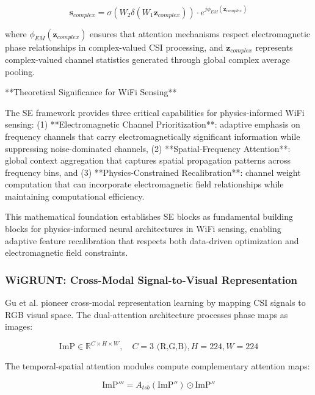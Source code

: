 \documentclass[journal]{IEEEtran}
\begin{document}
{\begin{equation}
\mathbf{s}_{complex} = \sigma(W_2\delta(W_1\mathbf{z}_{complex})) \cdot e^{j\phi_{EM}(\mathbf{z}_{complex})}
\label{eq:se_physics_complex}
\end{equation}

where $\phi_{EM}(\mathbf{z}_{complex})$ ensures that attention mechanisms respect electromagnetic phase relationships in complex-valued CSI processing, and $\mathbf{z}_{complex}$ represents complex-valued channel statistics generated through global complex average pooling.

**Theoretical Significance for WiFi Sensing**

The SE framework provides three critical capabilities for physics-informed WiFi sensing: (1) **Electromagnetic Channel Prioritization**: adaptive emphasis on frequency channels that carry electromagnetically significant information while suppressing noise-dominated channels, (2) **Spatial-Frequency Attention**: global context aggregation that captures spatial propagation patterns across frequency bins, and (3) **Physics-Constrained Recalibration**: channel weight computation that can incorporate electromagnetic field relationships while maintaining computational efficiency.

This mathematical foundation establishes SE blocks as fundamental building blocks for physics-informed neural architectures in WiFi sensing, enabling adaptive feature recalibration that respects both data-driven optimization and electromagnetic field constraints.

\subsubsection{WiGRUNT: Cross-Modal Signal-to-Visual Representation}

Gu et al. \cite{gu2022wigrunt} pioneer cross-modal representation learning by mapping CSI signals to RGB visual space. The dual-attention architecture processes phase maps as images:

\begin{equation}
\text{ImP} \in \mathbb{R}^{C \times H \times W}, \quad C=3 \text{ (R,G,B)}, H=224, W=224
\label{eq:wigrunt_rgb_mapping}
\end{equation}

The temporal-spatial attention modules compute complementary attention maps:

\begin{equation}
\text{ImP}''' = A_{tsb}(\text{ImP}'') \odot \text{ImP}''
\label{eq:wigrunt_dual_attention}
\end{equation}

}
\end{document}
